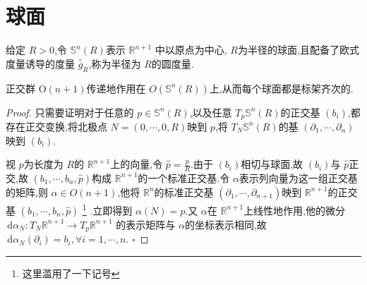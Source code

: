 \documentclass[../../几何与拓扑.tex]{subfiles}
\begin{document}
\section{球面}

\begin{definition}
    给定 \(  R> 0  \),令 \(  \mathbb{S}^{n}\left( R \right)   \)表示 \(  \mathbb{R} ^{n+ 1}  \)   中以原点为中心, \(  R  \)为半径的球面,且配备了欧式度量诱导的度量 \(  \overset{\scriptstyle\circ}{g}_{R}  \),称为半径为 \(  R  \)的圆度量.   
\end{definition}


\begin{proposition}
    正交群 \(  \mathrm{O}\left( n+ 1 \right)   \)传递地作用在 \(  O\left( \mathbb{S}^{n}\left( R \right)  \right)   \)上,从而每个球面都是标架齐次的.  
\end{proposition}


\begin{proof}
    只需要证明对于任意的 \(  p \in \mathbb{S}^{n}\left( R \right)   \),以及任意 \(  T_{p}\mathbb{S}^{n}\left( R \right)   \)的正交基 \(  \left( b_{i} \right)   \),都存在正交变换,将北极点 \(  N= \left( 0,\cdots ,0,R \right)   \)映到 \(  p  \),将 \(  T_{N}\mathbb{S}^{n}\left( R \right)   \)的基  \(  \left(  \partial_1,\cdots,\partial_n   \right)   \)      映到 \(  \left( b_{i} \right)   \).
    
    视 \(  p  \)为长度为 \(  R  \)的 \(  \mathbb{R}^{n+ 1}  \)上的向量,令 \(  \hat{p}=  \frac{p }{R }   \).由于 \(  \left( b_{i} \right)   \)相切与球面,故 \(  \left( b_{i} \right)   \)与 \(  \hat{p}  \)正交,故 \(  \left(  b_1,\cdots,b_n ,\hat{p} \right)   \)构成 \(  \mathbb{R} ^{n+ 1}  \)的一个标准正交基.令 \(  \alpha   \)表示列向量为这一组正交基的矩阵,则 \(  \alpha  \in O\left( n+ 1 \right)   \),他将 \(  \mathbb{R} ^{n}  \)的标准正交基 \(  \left(  \partial_1,\cdots,\partial_{n+ 1} \right)   \)映到 \(  \mathbb{R} ^{n+ 1}  \)的正交基 \(  \left(  b_1,\cdots,b_n ,\hat{p} \right)   \)     \footnote{这里滥用了一下记号}  .立即得到 \(   \alpha \left( N \right)= p   \).又 \(   \alpha   \)在 \(  \mathbb{R} ^{n+ 1}  \)上线性地作用,他的微分 \(  \,\mathrm{d} \alpha _{N}: T_{N}\mathbb{R} ^{n+ 1}\to T_{p}\mathbb{R} ^{n+ 1}  \)  的表示矩阵与 \(   \alpha   \)的坐标表示相同,故 \(  \,\mathrm{d} \alpha _{N}\left(  \partial _{i} \right)= b_{i},\forall i=  1,\cdots,n    \).  
    \hfill $\square$
\end{proof}
\end{document}
